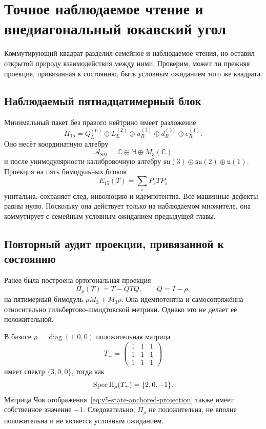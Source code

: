 \chapter{Точное наблюдаемое чтение и внедиагональный юкавский угол}

Коммутирующий квадрат разделил семейное и наблюдаемое чтения, но оставил
открытой природу взаимодействия между ними. Проверим, может ли прежняя
проекция, привязанная к состоянию, быть условным ожиданием того же квадрата.

\section{Наблюдаемый пятнадцатимерный блок}

Минимальный пакет без правого нейтрино имеет разложение
\begin{equation}
 H_{15}=Q_L^{(6)}\oplus L_L^{(2)}\oplus u_R^{(3)}
 \oplus d_R^{(3)}\oplus e_R^{(1)}.
\end{equation}
Оно несёт координатную алгебру
\begin{equation}
 \mathcal A_{\mathrm{SM}}=\mathbb C\oplus\mathbb H\oplus M_3(\mathbb C)
\end{equation}
и после унимодулярности калибровочную алгебру
$\mathfrak{su}(3)\oplus\mathfrak{su}(2)\oplus\mathfrak u(1)$.
Проекция на пять бимодульных блоков
\begin{equation}
 E_{15}(T)=\sum_{s}P_sTP_s
\end{equation}
унитальна, сохраняет след, инволюцию и идемпотентна. Все машинные дефекты
равны нулю. Поскольку она действует только на наблюдаемом множителе, она
коммутирует с семейным условным ожиданием предыдущей главы.

\section{Повторный аудит проекции, привязанной к состоянию}

Ранее была построена ортогональная проекция
\begin{equation}
 \Pi_\rho(T)=T-QTQ,
 \qquad Q=I-\rho,
 \label{eq:v5-state-anchored-projection}
\end{equation}
на пятимерный бимодуль
$\rho M_3+M_3\rho$. Она идемпотентна и самосопряжённа относительно
гильбертово-шмидтовской метрики. Однако это не делает её положительной.

В базисе $\rho=\operatorname{diag}(1,0,0)$ положительная матрица
\begin{equation}
 T_+=
 \begin{pmatrix}1&1&1\\1&1&1\\1&1&1\end{pmatrix}
\end{equation}
имеет спектр $\{3,0,0\}$, тогда как
\begin{equation}
 \operatorname{Spec}\Pi_\rho(T_+)=\{2,0,-1\}.
\end{equation}
Матрица Чоя отображения~\eqref{eq:v5-state-anchored-projection} также имеет
собственное значение $-1$. Следовательно, $\Pi_\rho$ не положительна, не
вполне положительна и не является условным ожиданием.

